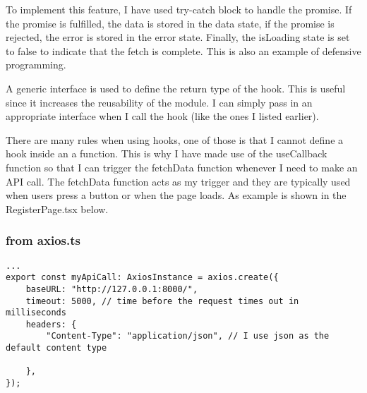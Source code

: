 To implement this feature, I have used try-catch block to handle the promise. If the promise is fulfilled, the data is stored in the data state, if the promise is rejected, the error is stored in the error state. Finally, the isLoading state is set to false to indicate that the fetch is complete. This is also an example of defensive programming.

A generic interface is used to define the return type of the hook. This is useful since it increases the reusability of the module. I can simply pass in an appropriate interface when I call the hook (like the ones I listed earlier).

There are many rules when using hooks, one of those is that I cannot define a hook inside an a function. This is why I have made use of the useCallback function so that I can trigger the fetchData function whenever I need to make an API call. The fetchData function acts as my trigger and they are typically used when users press a button or when the page loads. As example is shown in the RegisterPage.tsx below.

\subsubsection{from axios.ts}
\begin{verbatim}
...
export const myApiCall: AxiosInstance = axios.create({
    baseURL: "http://127.0.0.1:8000/", 
    timeout: 5000, // time before the request times out in milliseconds
    headers: {
        "Content-Type": "application/json", // I use json as the default content type 
        
    },
});
\end{verbatim}

